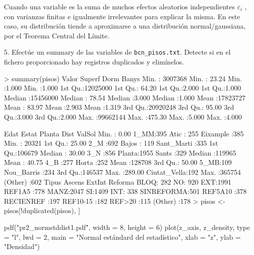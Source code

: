 \documentclass[11pt,a4paper]{article}
\begin{document}
Cuando una variable es la suma de muchos efectos aleatorios independientes $\varepsilon_i$ , con varianzas finitas e igualmente irrelevantes para explicar la misma. En este caso, su distribución tiende a aproximarse a una distribución normal/gaussiana, por el Teorema Central del Límite.

\newpage

\begin{tcolorbox}[colback=gray!20,colframe=gray!20, sharp corners]
5. Efectúe un summary de las variables de \texttt{bcn\_pisos.txt}. Detecte si en el fichero proporcionado hay registros duplicados y elimínelos.
\end{tcolorbox}

\begin{rcode}
> summary(pisos)
    Valor              Superf            Dorm           Banys      
 Min.   : 3007368   Min.   : 23.24   Min.   :1.000   Min.   :1.000  
 1st Qu.:12025000   1st Qu.: 64.20   1st Qu.:2.000   1st Qu.:1.000  
 Median :15456000   Median : 78.54   Median :3.000   Median :1.000  
 Mean   :17823727   Mean   : 83.97   Mean   :2.903   Mean   :1.319  
 3rd Qu.:20920248   3rd Qu.: 95.00   3rd Qu.:3.000   3rd Qu.:2.000  
 Max.   :99662144   Max.   :475.30   Max.   :5.000   Max.   :4.000  
                                                                    
      Edat         Estat        Planta               Dist         ValSol      
 Min.   :  0.00   1_MM:395   Atic  : 255   Eixample    :385   Min.   : 20321  
 1st Qu.: 25.00   2_M :692   Bajos : 119   Sant_Marti  :335   1st Qu.:106679  
 Median : 30.00   3_N :856   Planta:1955   Sants       :329   Median :119965  
 Mean   : 40.75   4_B :277                 Horta       :252   Mean   :128708  
 3rd Qu.: 50.00   5_MB:109                 Nou_Barris  :234   3rd Qu.:146537  
 Max.   :289.00                            Ciutat_Vella:192   Max.   :365754  
                                           (Other)     :602                   
  Tipus      Ascens    ExtInt           Reforma   
 BLOQ: 282   NO: 920   EXT:1991   REF1A5    :778  
 MANZ:2047   SI:1409   INT: 338   SINREFORMA:501  
                                  REF5A10   :378  
                                  RECIENREF :197  
                                  REF10-15  :182  
                                  REF>20    :115  
                                  (Other)   :178  
> pisos <- pisos[!duplicated(pisos), ]
\end{rcode}
pdf("pr2_normstddist1.pdf", width = 8, height = 6)
plot(z_axis, z_density, type = "l", lwd = 2,
	main = "Normal estándard del estadístico",
	xlab = "z", ylab = "Densidad")
\end{document}
